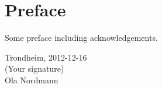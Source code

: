 \section*{Preface}
Some preface including acknowledgements.\\[2cm]

\begin{center}
Trondheim, 2012-12-16\\[1pc]
(Your signature)\\[1pc]
Ola Nordmann
\end{center}